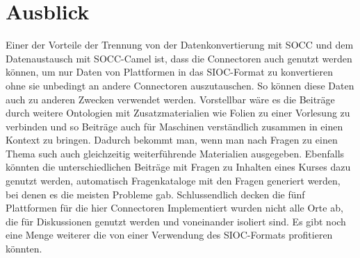 
\section{Ausblick} %
\label{sec:ausblick}

Einer der Vorteile der Trennung von der Datenkonvertierung mit SOCC und dem Datenaustausch mit SOCC-Camel ist, dass die Connectoren auch genutzt werden können, um nur Daten von Plattformen in das SIOC-Format zu konvertieren ohne sie unbedingt an andere Connectoren auszutauschen. So können diese Daten auch zu anderen Zwecken verwendet werden. Vorstellbar wäre es die Beiträge durch weitere Ontologien mit Zusatzmaterialien wie Folien zu einer Vorlesung zu verbinden und so Beiträge auch für Maschinen verständlich zusammen in einen Kontext zu bringen. Dadurch bekommt man, wenn man nach Fragen zu einen Thema such auch gleichzeitig weiterführende Materialien ausgegeben. Ebenfalls könnten die unterschiedlichen Beiträge mit Fragen zu Inhalten eines Kurses dazu genutzt werden, automatisch Fragenkataloge mit den Fragen generiert werden, bei denen es die meisten Probleme gab. Schlussendlich decken die fünf Plattformen für die hier Connectoren Implementiert wurden nicht alle Orte ab, die für Diskussionen genutzt werden und voneinander isoliert sind. Es gibt noch eine Menge weiterer die von einer Verwendung des SIOC-Formats profitieren könnten.


